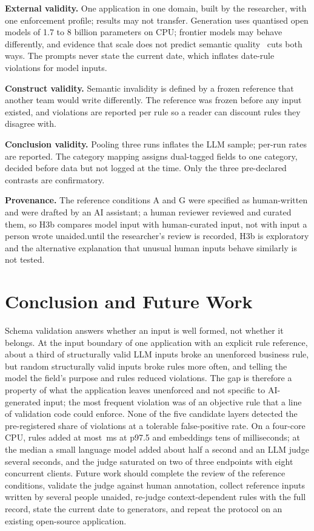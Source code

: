 \documentclass[conference]{IEEEtran}
\begin{document}
\textbf{External validity.} One application in one domain, built by the researcher, with one
enforcement profile; results may not transfer. Generation uses quantised open models of 1.7 to 8
billion parameters on CPU; frontier models may behave differently, and evidence that scale does not
predict semantic quality~\cite{singh2026sob,wrenn2026enterprise} cuts both ways. The prompts never
state the current date, which inflates date-rule violations for model inputs.

\textbf{Construct validity.} Semantic invalidity is defined by a frozen reference that another team
would write differently. The reference was frozen before any input existed, and violations are
reported per rule so a reader can discount rules they disagree with.

\textbf{Conclusion validity.} Pooling three runs inflates the LLM sample; per-run rates are reported.
The category mapping assigns dual-tagged fields to one category, decided before data but not logged
at the time. Only the three pre-declared contrasts are confirmatory.

\textbf{Provenance.} The reference conditions A and G were specified as human-written and were
drafted by an AI assistant; \ifreviewed a human reviewer reviewed and curated them, so H3b compares
model input with human-curated input, not with input a person wrote unaided.\else until the
researcher's review is recorded, H3b is exploratory and the alternative explanation that unusual
human inputs behave similarly is not tested.\fi

\section{Conclusion and Future Work}
\label{sec:conclusion}

Schema validation answers whether an input is well formed, not whether it belongs. At the input
boundary of one application with an explicit rule reference, about a third of structurally valid
LLM inputs broke an unenforced business rule, but random structurally valid inputs broke rules more
often, and telling the model the field's purpose and rules reduced violations. The gap is therefore
a property of what the application leaves unenforced and not specific to AI-generated input; the most frequent violation was of
an objective rule that a line of validation code could enforce. None of the five candidate layers
detected the pre-registered share of violations at a tolerable false-positive rate.
On a four-core CPU, rules added at most \,ms at p97.5 and embeddings tens of
milliseconds; at the median a small language model added about half a second and an LLM judge several
seconds, and the judge saturated on two of three endpoints with eight concurrent clients.
Future work should \ifreviewed\else complete the review of the reference conditions, \fi
\ifhumanlabels\else validate the judge against human annotation, \fi collect reference inputs written
by several people unaided, re-judge context-dependent rules with the full record, state the current date to generators,
and repeat the protocol on an existing open-source application.
\end{document}
